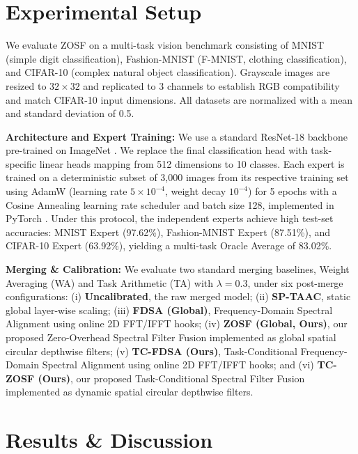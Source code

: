 \documentclass{article}
\theoremstyle{plain}
\theoremstyle{definition}
\theoremstyle{remark}
\begin{document}
\section{Experimental Setup}
\label{sec:experiments}

We evaluate ZOSF on a multi-task vision benchmark consisting of MNIST (simple digit classification), Fashion-MNIST (F-MNIST, clothing classification), and CIFAR-10 (complex natural object classification). Grayscale images are resized to $32 \times 32$ and replicated to 3 channels to establish RGB compatibility and match CIFAR-10 input dimensions. All datasets are normalized with a mean and standard deviation of 0.5.

\textbf{Architecture and Expert Training:} We use a standard ResNet-18 backbone \cite{he2016deep_resnet} pre-trained on ImageNet \cite{deng2009imagenet}. We replace the final classification head with task-specific linear heads mapping from 512 dimensions to 10 classes. Each expert is trained on a deterministic subset of 3,000 images from its respective training set using AdamW \cite{loshchilov2017decoupled_adamw} (learning rate $5 \times 10^{-4}$, weight decay $10^{-4}$) for 5 epochs with a Cosine Annealing learning rate scheduler and batch size 128, implemented in PyTorch \cite{paszke2019pytorch}. Under this protocol, the independent experts achieve high test-set accuracies: MNIST Expert (97.62\%), Fashion-MNIST Expert (87.51\%), and CIFAR-10 Expert (63.92\%), yielding a multi-task Oracle Average of 83.02\%.

\textbf{Merging \& Calibration:} We evaluate two standard merging baselines, Weight Averaging (WA) and Task Arithmetic (TA) with $\lambda = 0.3$, under six post-merge configurations: (i) \textbf{Uncalibrated}, the raw merged model; (ii) \textbf{SP-TAAC}, static global layer-wise scaling; (iii) \textbf{FDSA (Global)}, Frequency-Domain Spectral Alignment using online 2D FFT/IFFT hooks; (iv) \textbf{ZOSF (Global, Ours)}, our proposed Zero-Overhead Spectral Filter Fusion implemented as global spatial circular depthwise filters; (v) \textbf{TC-FDSA (Ours)}, Task-Conditional Frequency-Domain Spectral Alignment using online 2D FFT/IFFT hooks; and (vi) \textbf{TC-ZOSF (Ours)}, our proposed Task-Conditional Spectral Filter Fusion implemented as dynamic spatial circular depthwise filters.

\section{Results \& Discussion}
\label{sec:results}
\end{document}
